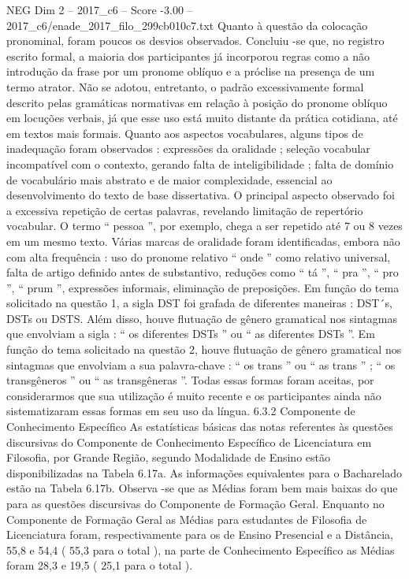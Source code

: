 \begin{textsample}{NEG Dim 2 – 2017\_c6 – Score -3.00 – 2017\_c6/enade\_2017\_filo\_299cb010c7.txt}
Quanto à questão da colocação pronominal, foram poucos os desvios observados.
Concluiu -se que, no registro escrito formal, a maioria dos participantes já incorporou regras como a não introdução da frase por um pronome oblíquo e a próclise na presença de um termo atrator.
Não se adotou, entretanto, o padrão excessivamente formal descrito pelas gramáticas normativas em relação à posição do pronome oblíquo em locuções verbais, já que esse uso está muito distante da prática cotidiana, até em textos mais formais.
Quanto aos aspectos vocabulares, alguns tipos de inadequação foram observados : expressões da oralidade ; seleção vocabular incompatível com o contexto, gerando falta de inteligibilidade ; falta de domínio de vocabulário mais abstrato e de maior complexidade, essencial ao desenvolvimento do texto de base dissertativa.
O principal aspecto observado foi a excessiva repetição de certas palavras, revelando limitação de repertório vocabular.
O termo “ pessoa ”, por exemplo, chega a ser repetido até 7 ou 8 vezes em um mesmo texto.
Várias marcas de oralidade foram identificadas, embora não com alta frequência : uso do pronome relativo “ onde ” como relativo universal, falta de artigo definido antes de substantivo, reduções como “ tá ”, “ pra ”, “ pro ”, “ prum ”, expressões informais, eliminação de preposições.
Em função do tema solicitado na questão 1, a sigla DST foi grafada de diferentes maneiras : DST´s, DSTs ou DSTS.
Além disso, houve flutuação de gênero gramatical nos sintagmas que envolviam a sigla : “ os diferentes DSTs ” ou “ as diferentes DSTs ”.
Em função do tema solicitado na questão 2, houve flutuação de gênero gramatical nos sintagmas que envolviam a sua palavra-chave : “ os trans ” ou “ as trans ” ; “ os transgêneros ” ou “ as transgêneras ”.
Todas essas formas foram aceitas, por considerarmos que sua utilização é muito recente e os participantes ainda não sistematizaram essas formas em seu uso da língua. 6.3.2 Componente de Conhecimento Específico As estatísticas básicas das notas referentes às questões discursivas do Componente de Conhecimento Específico de Licenciatura em Filosofia, por Grande Região, segundo Modalidade de Ensino estão disponibilizadas na Tabela 6.17a.
As informações equivalentes para o Bacharelado estão na Tabela 6.17b.
Observa -se que as Médias foram bem mais baixas do que para as questões discursivas do Componente de Formação Geral.
Enquanto no Componente de Formação Geral as Médias para estudantes de Filosofia de Licenciatura foram, respectivamente para os de Ensino Presencial e a Distância, 55,8 e 54,4 ( 55,3 para o total ), na parte de Conhecimento Específico as Médias foram 28,3 e 19,5 ( 25,1 para o total ).

\end{textsample}
